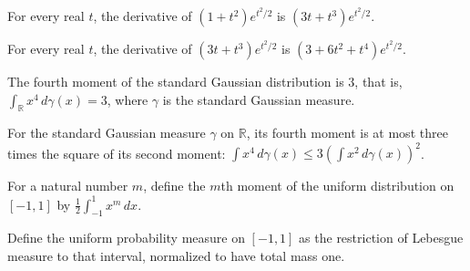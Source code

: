 \begin{theorem}
\label{FABL.deriv_one_add_sq_mul_exp_half_sq}
\leanok
{}
For every real $t$, the derivative of $(1+t^2)e^{t^2/2}$ is $(3t+t^3)e^{t^2/2}$.
\end{theorem}

\begin{theorem}
\label{FABL.deriv_three_mul_add_cube_mul_exp_half_sq}
\leanok
{}
For every real $t$, the derivative of $(3t+t^3)e^{t^2/2}$ is $(3+6t^2+t^4)e^{t^2/2}$.
\end{theorem}

\begin{theorem}
\label{FABL.standardGaussian_fourthMoment}
\leanok
{}
The fourth moment of the standard Gaussian distribution is $3$, that is, $\int_{\mathbb
R} x^4\,d\gamma(x)=3$, where $\gamma$ is the standard Gaussian measure.
\end{theorem}

\begin{theorem}
\label{FABL.standardGaussian_isThreeReasonable}
\leanok
{}
For the standard Gaussian measure $\gamma$ on $\mathbb R$, its fourth moment is at most
three times the square of its second moment: $\int x^4\,d\gamma(x)\le 3\left(\int
x^2\,d\gamma(x)\right)^2$.
\end{theorem}

\begin{definition}
\label{FABL.uniformIntervalMoment}
\leanok
For a natural number $m$, define the $m$th moment of the uniform distribution on
$[-1,1]$ by $\frac12\int_{-1}^{1}x^m\,dx$.
\end{definition}

\begin{definition}
\label{FABL.uniformIntervalMeasure}
\leanok
Define the uniform probability measure on $[-1,1]$ as the restriction of Lebesgue
measure to that interval, normalized to have total mass one.
\end{definition}


